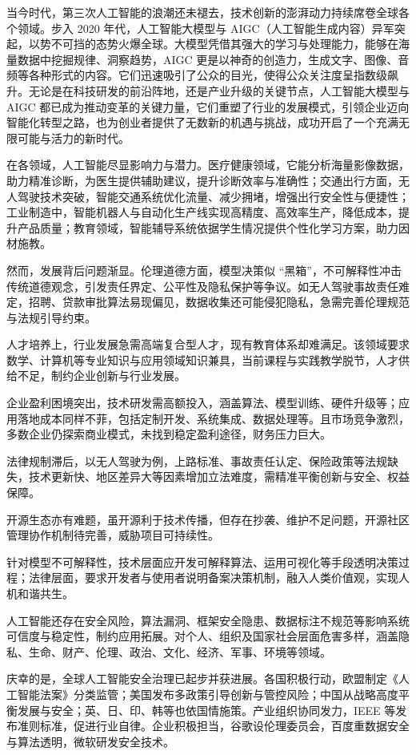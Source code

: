 当今时代，第三次人工智能的浪潮还未褪去，技术创新的澎湃动力持续席卷全球各个领域。步入 2020 年代，人工智能大模型与 AIGC（人工智能生成内容）异军突起，以势不可挡的态势火爆全球。大模型凭借其强大的学习与处理能力，能够在海量数据中挖掘规律、洞察趋势，AIGC 更是以神奇的创造力，生成文字、图像、音频等各种形式的内容。它们迅速吸引了公众的目光，使得公众关注度呈指数级飙升。无论是在科技研发的前沿阵地，还是产业升级的关键节点，人工智能大模型与 AIGC 都已成为推动变革的关键力量，它们重塑了行业的发展模式，引领企业迈向智能化转型之路，也为创业者提供了无数新的机遇与挑战，成功开启了一个充满无限可能与活力的新时代。


在各领域，人工智能尽显影响力与潜力。医疗健康领域，它能分析海量影像数据，助力精准诊断，为医生提供辅助建议，提升诊断效率与准确性；交通出行方面，无人驾驶技术突破，智能交通系统优化流量、减少拥堵，增强出行安全性与便捷性；工业制造中，智能机器人与自动化生产线实现高精度、高效率生产，降低成本，提升产品质量；教育领域，智能辅导系统依据学生情况提供个性化学习方案，助力因材施教。


然而，发展背后问题渐显。伦理道德方面，模型决策似 “黑箱”，不可解释性冲击传统道德观念，引发责任界定、公平性及隐私保护等争议。如无人驾驶事故责任难定，招聘、贷款审批算法易现偏见，数据收集还可能侵犯隐私，急需完善伦理规范与法规引导约束。


人才培养上，行业发展急需高端复合型人才，现有教育体系却难满足。该领域要求数学、计算机等专业知识与应用领域知识兼具，当前课程与实践教学脱节，人才供给不足，制约企业创新与行业发展。


企业盈利困境突出，技术研发需高额投入，涵盖算法、模型训练、硬件升级等；应用落地成本同样不菲，包括定制开发、系统集成、数据处理等。且市场竞争激烈，多数企业仍探索商业模式，未找到稳定盈利途径，财务压力巨大。


法律规制滞后，以无人驾驶为例，上路标准、事故责任认定、保险政策等法规缺失，技术更新快、地区差异大等因素增加立法难度，需精准平衡创新与安全、权益保障。


开源生态亦有难题，虽开源利于技术传播，但存在抄袭、维护不足问题，开源社区管理协作机制待完善，威胁项目可持续性。


针对模型不可解释性，技术层面应开发可解释算法、运用可视化等手段透明决策过程；法律层面，要求开发者与使用者说明备案决策机制，融入人类价值观，实现人机和谐共生。


人工智能还存在安全风险，算法漏洞、框架安全隐患、数据标注不规范等影响系统可信度与稳定性，制约应用拓展。对个人、组织及国家社会层面危害多样，涵盖隐私、生命、财产、伦理、政治、文化、经济、军事、环境等领域。


庆幸的是，全球人工智能安全治理已起步并获进展。各国积极行动，欧盟制定《人工智能法案》分类监管；美国发布多政策引导创新与管控风险；中国从战略高度平衡发展与安全；英、日、印、韩等也依国情施策。产业组织协同发力，IEEE 等发布准则标准，促进行业自律。企业积极担当，谷歌设伦理委员会，百度重数据安全与算法透明，微软研发安全技术。


